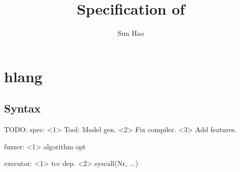 \documentclass{report}
\title{Specification of \thelang{}}
\author{Sun Hao}
\newcommand{\thelang}{hlang}
\begin{document}
\maketitle
\tableofcontents

\chapter{\thelang{}}
\section{Syntax}
TODO: 
spec:
    <1> Tool: Model gen.
    <2> Fix compiler.
    <3> Add features.

fuzzer:
    <1> algorithm opt

executor:
    <1> tcc dep.
    <2> syscall(Nr, ...)
\end{document}
